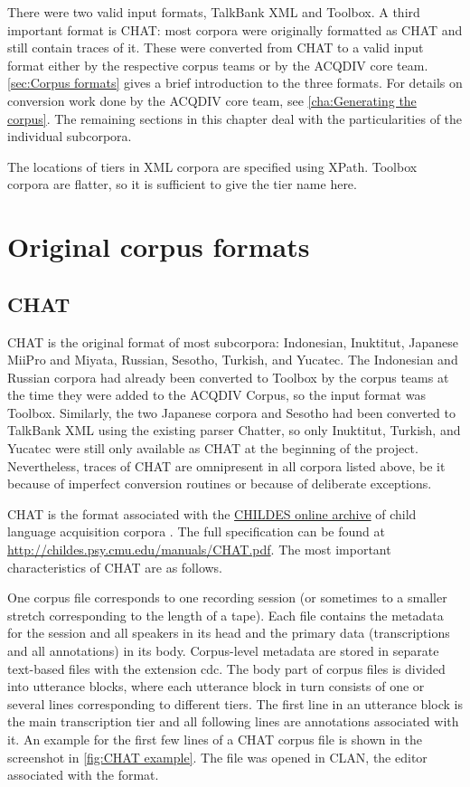 \documentclass[a4paper, 11pt]{book}
\begin{document}
There were two valid input formats, TalkBank XML and Toolbox. A third important format is CHAT: most corpora were originally formatted as CHAT and still contain traces of it. These were converted from CHAT to a valid input format either by the respective corpus teams or by the ACQDIV core team. \autoref{sec:Corpus formats} gives a brief introduction to the three formats. For details on conversion work done by the ACQDIV core team, see \autoref{cha:Generating the corpus}. The remaining sections in this chapter deal with the particularities of the individual subcorpora. 

The locations of tiers in XML corpora are specified using XPath. Toolbox corpora are flatter, so it is sufficient to give the tier name here. 


\section{Original corpus formats}
\label{sec:Corpus formats}

\subsection{CHAT}
\label{subsec:CHAT}

CHAT is the original format of most subcorpora: Indonesian, Inuktitut, Japanese MiiPro and Miyata, Russian, Sesotho, Turkish, and Yucatec. The Indonesian and
Russian corpora had already been converted to Toolbox by the corpus teams at the time they were added to the ACQDIV Corpus, so the input format was Toolbox.
Similarly, the two Japanese corpora and Sesotho had been converted to TalkBank XML using the existing parser Chatter, 
so only Inuktitut, Turkish, and Yucatec were still only available as CHAT at the beginning of the project. Nevertheless, traces of CHAT are omnipresent in all corpora listed above, be it because of imperfect conversion routines or because of deliberate exceptions. 

CHAT is the format associated with the \href{http://childes.psy.cmu.edu/}{CHILDES online archive} of child language acquisition corpora \citep{MacWhinney2000a}. The full specification can be found at \url{http://childes.psy.cmu.edu/manuals/CHAT.pdf}. 
The most important characteristics of CHAT are as follows. 

One corpus file corresponds to one recording session (or sometimes to a smaller stretch corresponding to the length of a tape). Each file contains the metadata for the session and all speakers in its head and the primary data (transcriptions and all annotations) in its body. Corpus-level metadata are stored in separate text-based files with the extension cdc. The body part of corpus files is divided into utterance blocks, where each utterance block in turn consists of one or several lines corresponding to different tiers. The first line in an utterance block is the main transcription tier and all following lines are annotations associated with it. An example for the first few lines of a CHAT corpus file is shown in the screenshot in \autoref{fig:CHAT example}. The file was opened in CLAN, the editor associated with the format. 
\end{document}
